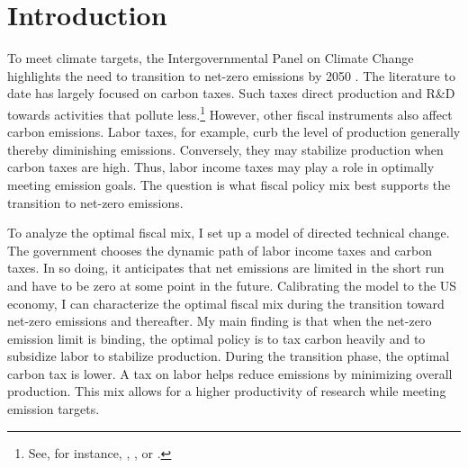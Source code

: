 \thispagestyle{empty}
\clearpage
\setcounter{page}{1}
\section{Introduction}




To meet climate targets, the Intergovernmental Panel on Climate Change highlights the need to transition to net-zero emissions by 2050 \citep{IPCC2022}.  The literature to date has largely focused on carbon taxes. Such taxes direct production and R\&D towards activities that pollute less.\footnote{ See, for instance, \cite{Acemoglu2012TheChange}, \cite{Golosov2014OptimalEquilibrium}, or \cite{Fried2018ClimateAnalysis}.} However, other fiscal instruments also affect carbon emissions. Labor taxes, for example, curb the level of production generally thereby diminishing emissions. Conversely, they may stabilize production when carbon taxes are high. Thus, labor income taxes may play a role in optimally meeting emission goals. The question is what fiscal policy mix best supports the transition to net-zero emissions.

To analyze the optimal fiscal mix, I set up a model of directed technical change. The government chooses the dynamic path of labor income taxes and carbon taxes. In so doing, it anticipates that net emissions are limited in the short run and have to be zero  at some point in the future. Calibrating the model to the US economy, I can characterize the optimal fiscal mix during the transition toward net-zero emissions and thereafter. My main finding is that when the net-zero emission limit is binding, the optimal policy is to tax carbon heavily and to subsidize labor to stabilize production. During the transition phase, the optimal carbon tax is lower. A tax on labor helps reduce emissions by minimizing overall production. This mix allows for a higher productivity of research while meeting emission targets.


